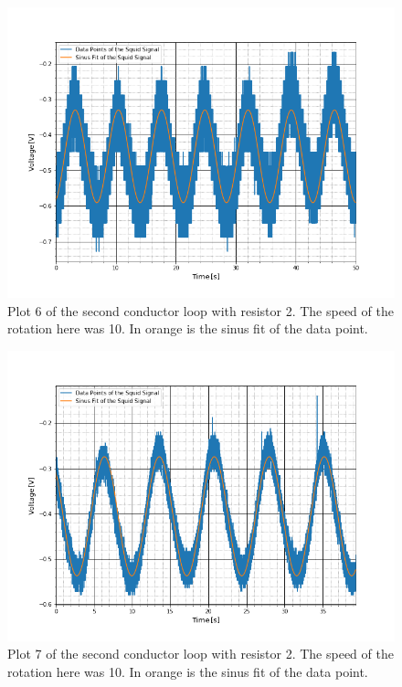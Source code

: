 \begin{figure}[ht]
	\includegraphics[scale=0.5]{Bild/r2_10_2}
	\centering
	\caption[Plot of second conductor loop 6]{Plot 6 of the second conductor loop with resistor 2. The speed of the rotation here was 10. In orange is the sinus fit of the data point.}
\end{figure}
\begin{figure}[ht]
	\includegraphics[scale=0.5]{Bild/r2_10_3}
	\centering
	\caption[Plot of second conductor loop 7]{Plot 7 of the second conductor loop with resistor 2. The speed of the rotation here was 10. In orange is the sinus fit of the data point.}
\end{figure}
